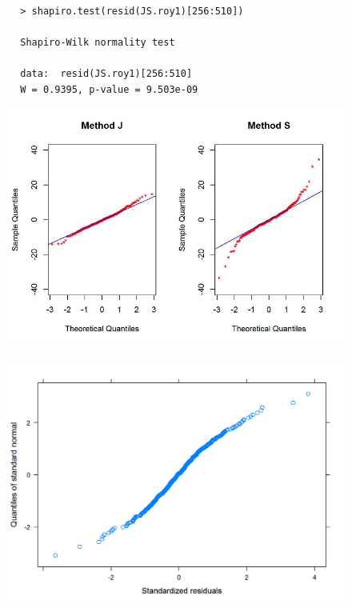 \documentclass[12pt, a4paper]{report}
\theoremstyle{plain}
\theoremstyle{definition}
\theoremstyle{remark}
\begin{document}
	\begin{framed}
		\begin{verbatim}
		> shapiro.test(resid(JS.roy1)[256:510])
		
		Shapiro-Wilk normality test
		
		data:  resid(JS.roy1)[256:510]
		W = 0.9395, p-value = 9.503e-09
		\end{verbatim}
	\end{framed}
	\begin{figure}[h!]
		\centering
		\includegraphics[width=0.9\linewidth]{images/Resid-newplot2}
		
	\end{figure}
	
	
	\begin{figure}[h!]
		\centering
		\includegraphics[width=0.9\linewidth]{images/ResidPlot3}
		\label{fig:ResidPlot3}
	\end{figure}
	
\end{document}
